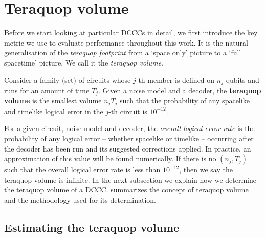 \section{Teraquop volume}\label{sec:teraquop_volume}

Before we start looking at particular DCCCs in detail, we first introduce the key
metric we use to evaluate performance throughout this work.
It is the natural generalisation of the \emph{teraquop footprint} \cite{gidney2021fault} from a `space only' picture to a `full spacetime' picture.
We call it the \emph{teraquop volume}.

\begin{definition}
    Consider a family (set) of circuits whose $j$-th member is defined on $n_j$ qubits and runs for an amount of time $T_j$.
    Given a noise model and a decoder,
    the \textbf{teraquop volume} is the smallest volume $n_j T_j$ such that the probability of any spacelike and timelike logical error in the $j$-th circuit is $10^{-12}$.
\end{definition}

For a given circuit, noise model and decoder, the \emph{overall logical error rate} is the probability of any logical error -- whether spacelike or timelike -- occurring after the decoder has been run and its suggested corrections applied.
In practice, an approximation of this value will be found numerically.
If there is no $(n_j, T_j)$ such that the overall logical error rate is less than $10^{-12}$,
then we say the teraquop volume is infinite.
In the next subsection we explain how we determine the teraquop volume of a DCCC.
 summarizes the concept of teraquop volume and the methodology used for its determination.

\subsection{Estimating the teraquop volume}\label{subsec:estimating-teraquop-volume}

